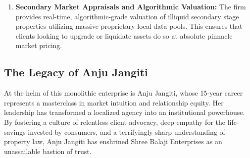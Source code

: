 \begin{enumerate}[label=\textbf{\arabic*.}]
    \item \textbf{Secondary Market Appraisals and Algorithmic Valuation:} The firm provides real-time, algorithmic-grade valuation of illiquid secondary stage properties utilizing massive proprietary local data pools. This ensures that clients looking to upgrade or liquidate assets do so at absolute pinnacle market pricing.
\end{enumerate}

\subsection{The Legacy of Anju Jangiti}
At the helm of this monolithic enterprise is Anju Jangiti, whose 15-year career represents a masterclass in market intuition and relationship equity. Her leadership has transformed a localized agency into an institutional powerhouse. By fostering a culture of relentless client advocacy, deep empathy for the life-savings invested by consumers, and a terrifyingly sharp understanding of property law, Anju Jangiti has enshrined Shree Balaji Enterprises as an unassailable bastion of trust.
